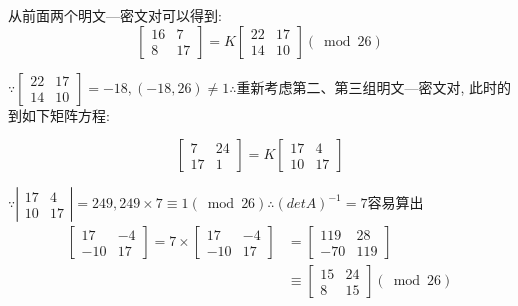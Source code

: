 \documentclass[UTF8]{ctexart}
\begin{document}
\begin{itemize}
\begin{enumerate}
\begin{itemize}
                从前面两个明文---密文对可以得到:
                $$\left[ \begin{array}{cc}{16} &{7}\\ {8} &{17} \end{array}\right]=K\left[ \begin{array}{cc}{22} &{17}\\ {14} &{10} \end{array}\right](\bmod 26)$$

                $
                    \because \left[ \begin{array}{cc}{22} &{17}\\ {14} &{10}\end{array}\right]=-18, (-18, 26)\neq 1
                    \therefore
                $重新考虑第二、第三组明文---密文对, 此时的到如下矩阵方程:

                $$\left[ \begin{array}{cc}{7} &{24}\\ {17} &{1} \end{array}\right]=K\left[ \begin{array}{cc}{17} &{4}\\ {10} &{17} \end{array}\right]$$

                $
                    \because \left| \begin{array}{cc}{17} &{4}\\ {10} &{17} \end{array}\right|=249, 249\times 7\equiv 1(\bmod 26)
                        \therefore (detA)^{-1}=7
                $容易算出
                $$
                \begin{aligned}
                    \left[ \begin{array}{cc}{17} &{-4}\\ {-10} &{17} \end{array}\right]=7\times \left[ \begin{array}{cc}{17} &{-4}\\ {-10} &{17} \end{array}\right]
                            &=\left[ \begin{array}{cc}{119} &{28}\\ {-70} &{119} \end{array}\right]\\
                                &\equiv \left[ \begin{array}{cc}{15} &{24}\\ {8} &{15} \end{array}\right](\bmod 26)
                \end{aligned}
                $$


\end{itemize}
\end{enumerate}
\end{itemize}
\end{document}
